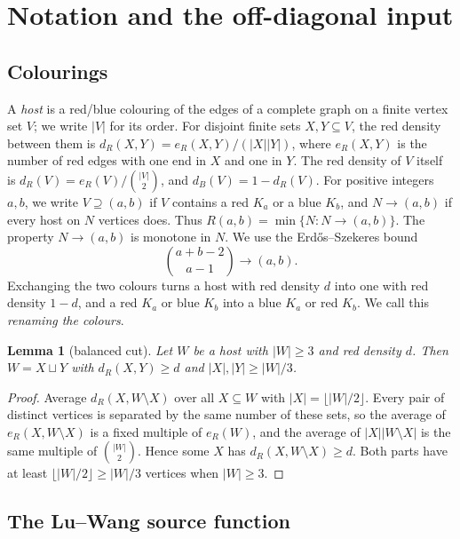 \documentclass[11pt]{article}
\newtheorem{lemma}[theorem]{Lemma}
\theoremstyle{definition}
\theoremstyle{remark}
\newcommand{\arrow}{\longrightarrow}
\begin{document}
\section{Notation and the off-diagonal input}\label{sec:prelim}

\subsection{Colourings}

A \emph{host} is a red/blue colouring of the edges of a complete graph on a finite vertex set $V$; we write $|V|$ for
its order. For disjoint finite sets $X,Y\subseteq V$, the red density between them is
$d_R(X,Y)=e_R(X,Y)/(|X||Y|)$, where $e_R(X,Y)$ is the number of red edges with one end in $X$ and one in $Y$. The red
density of $V$ itself is $d_R(V)=e_R(V)/\binom{|V|}2$, and $d_B(V)=1-d_R(V)$. For positive integers $a,b$, we write
$V\supseteq(a,b)$ if $V$ contains a red $K_a$ or a blue $K_b$, and $N\arrow(a,b)$ if every host on $N$ vertices does.
Thus $R(a,b)=\min\{N:N\arrow(a,b)\}$. The property $N\arrow(a,b)$ is monotone in $N$. We use the Erd\H{o}s--Szekeres
bound
\[
\binom{a+b-2}{a-1}\arrow(a,b).
\]
Exchanging the two colours turns a host with red density $d$ into one with red density $1-d$, and a red $K_a$ or
blue $K_b$ into a blue $K_a$ or red $K_b$. We call this \emph{renaming the colours}.

\begin{lemma}[balanced cut]\label{lem:cut}
Let $W$ be a host with $|W|\ge3$ and red density $d$. Then $W=X\sqcup Y$ with $d_R(X,Y)\ge d$ and
$|X|,|Y|\ge|W|/3$.
\end{lemma}

\begin{proof}
Average $d_R(X,W\setminus X)$ over all $X\subseteq W$ with $|X|=\lfloor|W|/2\rfloor$. Every pair of distinct vertices
is separated by the same number of these sets, so the average of $e_R(X,W\setminus X)$ is a fixed multiple of
$e_R(W)$, and the average of $|X||W\setminus X|$ is the same multiple of $\binom{|W|}2$. Hence some $X$ has
$d_R(X,W\setminus X)\ge d$. Both parts have at least $\lfloor|W|/2\rfloor\ge|W|/3$ vertices when $|W|\ge3$.
\end{proof}

\subsection{The Lu--Wang source function}
\end{document}

